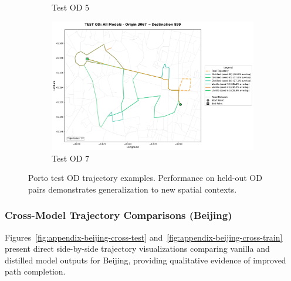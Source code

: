 \begin{figure}[H]
\begin{subfigure}{0.49\linewidth}
        \caption{Test OD 5}
    \end{subfigure}
    \begin{subfigure}{0.49\linewidth}
        \centering
        \includegraphics[width=\linewidth]{assets/plots/eval/porto/trajectories/test_od_comparison_7_origin3067_dest899.pdf}
        \caption{Test OD 7}
    \end{subfigure}
    \caption{Porto test OD trajectory examples. Performance on held-out OD pairs demonstrates generalization to new spatial contexts.}
    \label{fig:appendix-porto-traj-test}
\end{figure}

\subsubsection{Cross-Model Trajectory Comparisons (Beijing)}
\label{app:cross-model-beijing}

Figures~\ref{fig:appendix-beijing-cross-test} and~\ref{fig:appendix-beijing-cross-train} present direct side-by-side trajectory visualizations comparing vanilla and distilled model outputs for Beijing, providing qualitative evidence of improved path completion.

